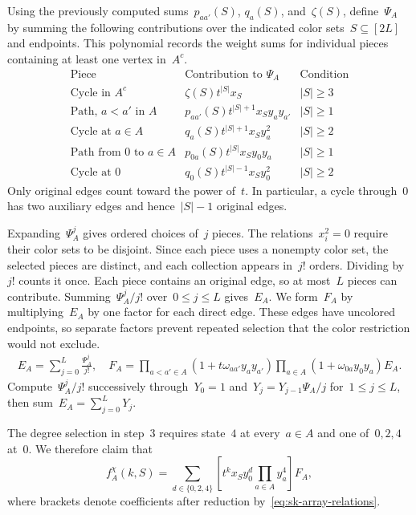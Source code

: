 \documentclass[letterpaper,11pt,reqno]{amsart}
\renewcommand{\leq}{\leqslant}
\renewcommand{\geq}{\geqslant}
\begin{document}
Using the previously computed sums~$p_{aa'}(S)$, $q_a(S)$, and~$\zeta(S)$, define~$\Psi_A$ by summing the following contributions over the indicated color sets~$S\subseteq[2L]$ and endpoints. This polynomial records the weight sums for individual pieces containing at least one vertex in~$A^c$.
\begin{equation}\label{eq:sk-piece-polynomial}
\begin{array}{lll}
\text{Piece} & \text{Contribution to }\Psi_A & \text{Condition}\\ \hline
\text{Cycle in }A^c & \zeta(S)t^{|S|}x_S & |S|\geq3\\
\text{Path, }a<a'\text{ in }A & p_{aa'}(S)t^{|S|+1}x_Sy_ay_{a'} & |S|\geq1\\
\text{Cycle at }a\in A & q_a(S)t^{|S|+1}x_Sy_a^2 & |S|\geq2\\
\text{Path from }0\text{ to }a\in A & p_{0a}(S)t^{|S|}x_Sy_0y_a & |S|\geq1\\
\text{Cycle at }0 & q_0(S)t^{|S|-1}x_Sy_0^2 & |S|\geq2
\end{array}
\end{equation}
Only original edges count toward the power of~$t$. In particular, a cycle through~$0$ has two auxiliary edges and hence~$|S|-1$ original edges.

Expanding~$\Psi_A^j$ gives ordered choices of~$j$ pieces. The relations~$x_i^2=0$ require their color sets to be disjoint. Since each piece uses a nonempty color set, the selected pieces are distinct, and each collection appears in~$j!$ orders. Dividing by~$j!$ counts it once. Each piece contains an original edge, so at most~$L$ pieces can contribute. Summing~$\Psi_A^j/j!$ over~$0\leq j\leq L$ gives~$E_A$. We form~$F_A$ by multiplying~$E_A$ by one factor for each direct edge. These edges have uncolored endpoints, so separate factors prevent repeated selection that the color restriction would not exclude.
\begin{equation}\label{eq:sk-assembled-polynomial}
\begin{aligned}
E_A=\sum_{j=0}^{L}\frac{\Psi_A^j}{j!}, \quad 
F_A=\prod_{a<a'\in A}(1+t\omega_{aa'}y_ay_{a'})
\prod_{a\in A}(1+\omega_{0a}y_0y_a)E_A.
\end{aligned}
\end{equation}
Compute~$\Psi_A^j/j!$ successively through~$Y_0=1$ and~$Y_j=Y_{j-1}\Psi_A/j$ for~$1\leq j\leq L$, then sum~$E_A=\sum_{j=0}^L Y_j$.

The degree selection in step~3 requires state~$4$ at every~$a\in A$ and one of~$0,2,4$ at~$0$. We therefore claim that
\begin{equation}\label{eq:sk-accepting-coefficient}
f_A^\chi(k,S)=\sum_{d\in\{0,2,4\}}\left[t^kx_Sy_0^d\prod_{a\in A}y_a^4\right]F_A,
\end{equation}
where brackets denote coefficients after reduction by~\eqref{eq:sk-array-relations}.
\end{document}
